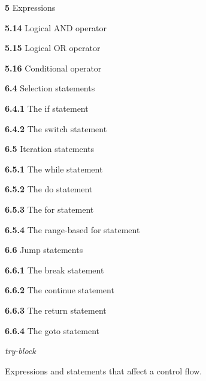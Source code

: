 \begin{figure}[t!]
\small
\begin{minipage}[t]{.475\linewidth}
\begin{myitemize}
\item{\textbf{5} Expressions}
	\begin{inneritemize}
	\item{\textbf{5.14} Logical AND operator}
	\item{\textbf{5.15} Logical OR operator}
	\item{\textbf{5.16} Conditional operator}
	\end{inneritemize}
\end{myitemize}
\end{minipage}
\begin{minipage}[t]{.475\linewidth}
\begin{myitemize}
\item{\textbf{6.4} Selection statements}
	\begin{inneritemize}
	\item{\textbf{6.4.1} The if statement}
	\item{\textbf{6.4.2} The switch statement}
	\end{inneritemize}
\item{\textbf{6.5} Iteration statements}
	\begin{inneritemize}
	\item{\textbf{6.5.1} The while statement}
	\item{\textbf{6.5.2} The do statement}
	\item{\textbf{6.5.3} The for statement}
	\item{\textbf{6.5.4} The range-based for statement}
	\end{inneritemize}
\item{\textbf{6.6} Jump statements}
	\begin{inneritemize}
	\item{\textbf{6.6.1} The break statement}
	\item{\textbf{6.6.2} The continue statement}
	\item{\textbf{6.6.3} The return statement}
	\item{\textbf{6.6.4} The goto statement}
	\end{inneritemize}
\item{\textit{try-block}}
\end{myitemize}
\end{minipage}
\caption{Expressions and statements that affect a control flow.}
\label{control-stmt-expr}
\end{figure}

